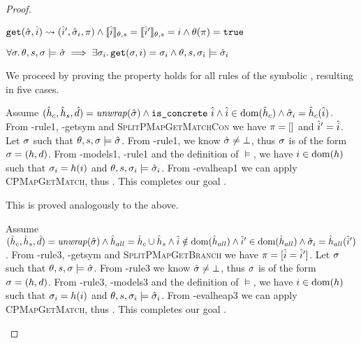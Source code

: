 \begin{proof}


\pfassume \begin{hypvlist}
 $\texttt{get}(\hat{\sigma},\hat{i})\rightsquigarrow(\hat{i}', \hat{\sigma}_i, \pi) \land \llbracket\hat{i}\rrbracket_{\theta,s}=\llbracket\hat{i}'\rrbracket_{\theta,s}=i \land \theta(\pi)=\texttt{true} $
\end{hypvlist}
\pfprove \begin{goalvlist}
 $\forall \sigma\ldotp \theta,s,\sigma \models \hat{\sigma} \implies \exists \sigma_i \ldotp \texttt{get}(\sigma, i)=\sigma_i \land \theta,s,\sigma_i \models \hat{\sigma}_i$
\end{goalvlist}

We proceed by proving the property holds for all rules of the symbolic , resulting in five cases.


\begin{hypvlist}
 Assume $(\hat{h}_c,\hat{h}_s,\hat{d})=\mathit{unwrap}(\hat{\sigma}) \land \texttt{is\_concrete}~\hat{i} \land \hat{i}\in\operatorname{dom}(\hat{h}_c) \land \hat{\sigma}_{i}=\hat{h}_c(\hat{i})$.
 From \hyp{rule1}, \hyp{getsym} and \textsc{SplitPMapGetMatchCon} we have $\pi=[]$ and $\hat{i}'=\hat{i}$.
 Let $\sigma$ such that $\theta,s,\sigma\models\hat{\sigma}$.
 From \hyp{rule1}, we know $\hat{\sigma}\neq\bot$, thus $\sigma$ is of the form $\sigma=(h,d)$.
 From \hyp{models1}, \hyp{rule1} and the definition of $\models$, we have $i\in \operatorname{dom}(h)$ such that $\sigma_i=h(i)$ and ${\theta,s,\sigma_i\models\hat{\sigma}_i}$.
 From \hyp{evalheap1} we can apply \textsc{CPMapGetMatch}, thus . This completes our goal .
\end{hypvlist}

 This is proved analogously to the above.


\begin{hypvlist}
 Assume $(\hat{h}_c,\hat{h}_s,\hat{d})=\mathit{unwrap}(\hat{\sigma}) \land \hat{h}_{all}=\hat{h}_c\cup \hat{h}_s \land \hat{i}\notin \operatorname{dom}(\hat{h}_{all}) \land \hat{i}'\in\operatorname{dom}(\hat{h}_{all}) \land {\hat{\sigma}_i=\hat{h}_{all}(\hat{i}')}$.
 From \hyp{rule3}, \hyp{getsym} and \textsc{SplitPMapGetBranch} we have $\pi=[\hat{i} = \hat{i}']$.
 Let $\sigma$ such that $\theta,s,\sigma\models\hat{\sigma}$.
 From \hyp{rule3} we know $\hat{\sigma}\neq\bot$, thus $\sigma$ is of the form $\sigma=(h,d)$.
 From \hyp{rule3}, \hyp{models3} and the definition of $\models$, we have $i\in \operatorname{dom}(h)$  such that $\sigma_i=h(i)$ and ${\theta,s,\sigma_i\models\hat{\sigma}_i}$.
 From \hyp{evalheap3} we can apply \textsc{CPMapGetMatch}, thus . This completes our goal .
\end{hypvlist}


\end{proof}

